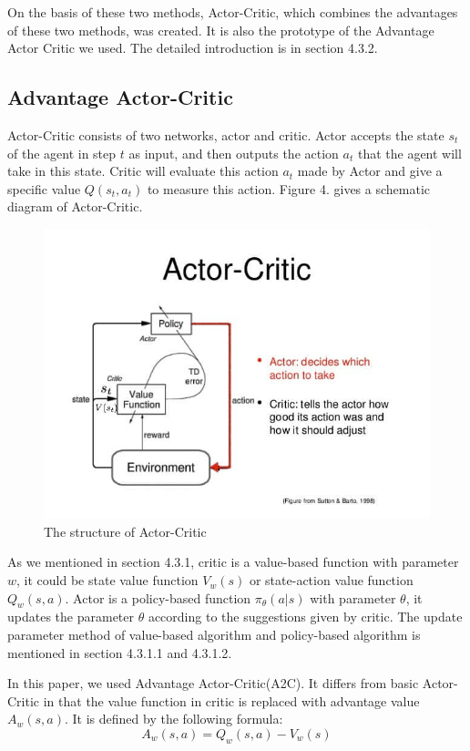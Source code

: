 On the basis of these two methods, Actor-Critic, which combines the advantages of these two methods, was created. It is also the prototype of the Advantage Actor Critic we used. The detailed introduction is in section 4.3.2.

\subsection{Advantage Actor-Critic}
Actor-Critic consists of two networks, actor and critic. Actor accepts the state $s_t$ of the agent in step $t$ as input, and then outputs the action $a_t$ that the agent will take in this state. Critic will evaluate this action $a_t$ made by Actor and give a specific value $Q(s_t,a_t)$ to measure this action. Figure 4. gives a schematic diagram of Actor-Critic.

\begin{figure}
    \centering
    \includegraphics[width=\linewidth]{../Figures/Actor_Critic.jpg}
    \caption{The structure of Actor-Critic}
\end{figure}

As we mentioned in section 4.3.1, critic is a value-based function with parameter $w$, it could be state value function $V_w(s)$ or state-action value function $Q_w(s,a)$. Actor is a policy-based function $\pi _\theta (a|s)$ with parameter $\theta$, it updates the parameter $\theta$ according to the suggestions given by critic. The update parameter method of value-based algorithm and policy-based algorithm is mentioned in section 4.3.1.1 and 4.3.1.2.

In this paper, we used Advantage Actor-Critic(A2C). It differs from basic Actor-Critic in that the value function in critic is replaced with advantage value $A_w(s,a)$. It is defined by the following formula:
$$
A_w(s,a)=Q_w(s,a)-V_w(s)
$$

